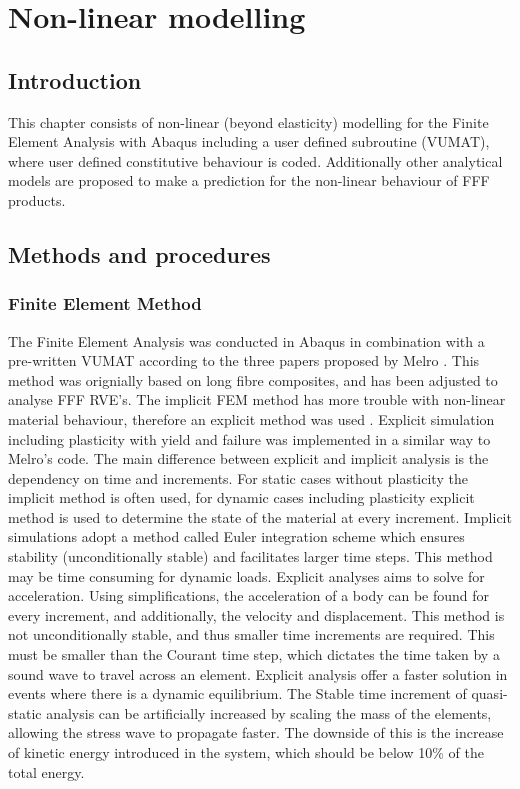 \chapter{Non-linear modelling}
\label{chp:5}

\section{Introduction}
This chapter consists of  non-linear (beyond elasticity) modelling for the Finite Element Analysis with Abaqus including a user defined subroutine (VUMAT), where user defined constitutive behaviour is coded. Additionally other analytical models are proposed to make a prediction for the non-linear behaviour of FFF products. 

\section{Methods and procedures}
\subsection{Finite Element Method}
The Finite Element Analysis was conducted in Abaqus in combination with a pre-written VUMAT according to the three papers proposed by Melro \cite{Melro2012InfluenceMaterials}\cite{Melro2013}\cite{Melro2013MicromechanicalModelling}. This method was orignially based on long fibre composites, and has been adjusted to analyse FFF RVE's. The implicit FEM method has more trouble with non-linear material behaviour, therefore an explicit method was used \cite{Harish2019ImplicitMethod}.
Explicit simulation including plasticity with yield and failure was implemented in a similar way to Melro's code. The main difference between explicit and implicit analysis is the dependency on time and increments. For static cases without plasticity the implicit method is often used, for dynamic cases including plasticity explicit method is used to determine the state of the material at every increment. Implicit simulations adopt a method called Euler integration scheme which ensures stability (unconditionally stable) and facilitates larger time steps. This method may be time consuming for dynamic loads.  Explicit analyses aims to solve for acceleration. Using simplifications, the acceleration of a body can be found for every increment, and additionally, the velocity and displacement. This method is not unconditionally stable, and thus smaller time increments are required. This must be smaller than the Courant time step, which dictates the time taken by a sound wave to travel across an element. Explicit analysis offer a faster solution in events where there is a dynamic equilibrium.  The Stable time increment of quasi-static analysis can be artificially increased by scaling the mass of the elements, allowing the stress wave to propagate faster. The downside of this is the increase of kinetic energy introduced in the system, which should be below 10\% of the total energy.  

